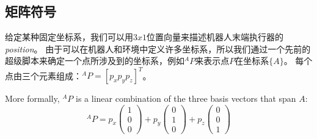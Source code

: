 \subsection{矩阵符号}


给定某种固定坐标系，我们可以用$ 3x1 $位置向量来描述机器人末端执行器的\emph {position}。 由于可以在机器人和环境中定义许多坐标系，所以我们通过一个先前的超级脚本来确定一个点所涉及到的坐标系，例如$ ^AP $来表示点$ P $在坐标系$\{A\}$。 每个点由三个元素组成：$ ^AP = [p_x p_y p_z] ^ T $。

More formally, $^AP$ is a linear combination of the three basis vectors that span $A$:
\begin{equation}
^AP=p_x\left(\begin{array}{c}1\\0\\0\end{array}\right)+p_y\left(\begin{array}{c}0\\1\\0\end{array}\right)+p_z\left(\begin{array}{c}0\\0\\1\end{array}\right)\label{eq:basis}
\end{equation}



